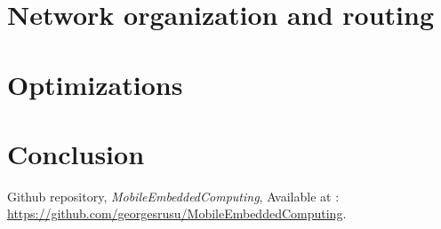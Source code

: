 \documentclass[a4paper,10pt]{article}
\begin{document}
\section{Network organization and routing}

\section{Optimizations}
\label{opti}

\section{Conclusion}

\begin{thebibliography}{9}

Github repository,
\textit{MobileEmbeddedComputing}, Available at :
\url{https://github.com/georgesrusu/MobileEmbeddedComputing}.


\end{thebibliography}
\end{document}
